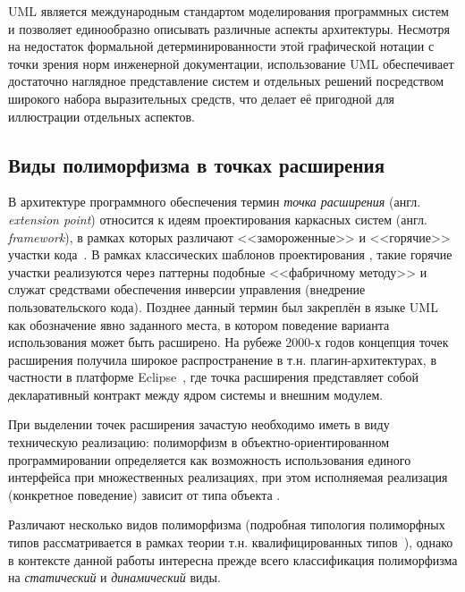 UML является международным стандартом моделирования
программных систем и позволяет единообразно описывать различные
аспекты архитектуры. Несмотря на недостаток формальной
детерминированности этой графической нотации с точки зрения
норм инженерной документации,
использование UML обеспечивает достаточно наглядное представление
систем и отдельных решений посредством
широкого набора выразительных средств, что делает её пригодной
для иллюстрации отдельных аспектов.

\subsection{Виды полиморфизма в точках расширения}

В архитектуре программного обеспечения термин \emph{точка расширения}
(англ. \emph{extension point}) относится к идеям проектирования каркасных
систем (англ. \emph{framework}),
в рамках которых различают <<замороженные>> и <<горячие>>
участки кода~\cite{Pree1994-frameworks}. В рамках
классических шаблонов проектирования \cite{gof1994design-patterns},
такие горячие участки
реализуются через паттерны подобные <<фабричному методу>> и служат
средствами обеспечения инверсии управления (внедрение пользовательского
кода). Позднее данный
термин был закреплён в языке UML как обозначение явно заданного места,
в котором поведение варианта использования может быть
расширено\cite{UML-1.5}. На рубеже 2000-х годов концепция точек расширения
получила широкое распространение в т.н. плагин-архитектурах, в
частности в платформе Eclipse~\cite{Eclipse-plugins}, где точка
расширения представляет собой декларативный контракт между ядром
системы и внешним модулем. %

При выделении точек расширения зачастую необходимо иметь в виду
техническую реализацию: полиморфизм в объектно-ориентированном
программировании определяется как возможность использования единого
интерфейса при множественных реализациях, при этом исполняемая
реализация (конкретное поведение) зависит
от типа объекта \cite{CardelliWegner1985}.

Различают несколько видов полиморфизма (подробная типология полиморфных типов рассматривается в рамках теории т.н. квалифицированных
типов~\cite{krieg1992esop-qualified-types-polymorphism}), однако
в контексте данной работы интересна прежде всего классификация
полиморфизма на \emph{статический} и \emph{динамический} виды.

